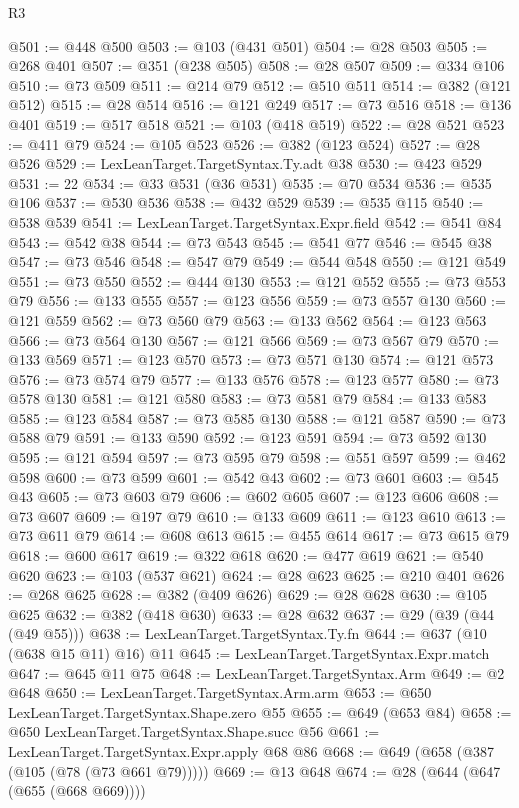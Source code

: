 \begin{lexlean}{R3}
\begin{coremodule}
@501 := @448 @500
@503 := @103 (@431 @501)
@504 := @28 @503
@505 := @268 @401
@507 := @351 (@238 @505)
@508 := @28 @507
@509 := @334 @106
@510 := @73 @509
@511 := @214 @79
@512 := @510 @511
@514 := @382 (@121 @512)
@515 := @28 @514
@516 := @121 @249
@517 := @73 @516
@518 := @136 @401
@519 := @517 @518
@521 := @103 (@418 @519)
@522 := @28 @521
@523 := @411 @79
@524 := @105 @523
@526 := @382 (@123 @524)
@527 := @28 @526
@529 := LexLeanTarget.TargetSyntax.Ty.adt @38
@530 := @423 @529
@531 := 22
@534 := @33 @531 (@36 @531)
@535 := @70 @534
@536 := @535 @106
@537 := @530 @536
@538 := @432 @529
@539 := @535 @115
@540 := @538 @539
@541 := LexLeanTarget.TargetSyntax.Expr.field
@542 := @541 @84
@543 := @542 @38
@544 := @73 @543
@545 := @541 @77
@546 := @545 @38
@547 := @73 @546
@548 := @547 @79
@549 := @544 @548
@550 := @121 @549
@551 := @73 @550
@552 := @444 @130
@553 := @121 @552
@555 := @73 @553 @79
@556 := @133 @555
@557 := @123 @556
@559 := @73 @557 @130
@560 := @121 @559
@562 := @73 @560 @79
@563 := @133 @562
@564 := @123 @563
@566 := @73 @564 @130
@567 := @121 @566
@569 := @73 @567 @79
@570 := @133 @569
@571 := @123 @570
@573 := @73 @571 @130
@574 := @121 @573
@576 := @73 @574 @79
@577 := @133 @576
@578 := @123 @577
@580 := @73 @578 @130
@581 := @121 @580
@583 := @73 @581 @79
@584 := @133 @583
@585 := @123 @584
@587 := @73 @585 @130
@588 := @121 @587
@590 := @73 @588 @79
@591 := @133 @590
@592 := @123 @591
@594 := @73 @592 @130
@595 := @121 @594
@597 := @73 @595 @79
@598 := @551 @597
@599 := @462 @598
@600 := @73 @599
@601 := @542 @43
@602 := @73 @601
@603 := @545 @43
@605 := @73 @603 @79
@606 := @602 @605
@607 := @123 @606
@608 := @73 @607
@609 := @197 @79
@610 := @133 @609
@611 := @123 @610
@613 := @73 @611 @79
@614 := @608 @613
@615 := @455 @614
@617 := @73 @615 @79
@618 := @600 @617
@619 := @322 @618
@620 := @477 @619
@621 := @540 @620
@623 := @103 (@537 @621)
@624 := @28 @623
@625 := @210 @401
@626 := @268 @625
@628 := @382 (@409 @626)
@629 := @28 @628
@630 := @105 @625
@632 := @382 (@418 @630)
@633 := @28 @632
@637 := @29 (@39 (@44 (@49 @55)))
@638 := LexLeanTarget.TargetSyntax.Ty.fn
@644 := @637 (@10 (@638 @15 @11) @16) @11
@645 := LexLeanTarget.TargetSyntax.Expr.match
@647 := @645 @11 @75
@648 := LexLeanTarget.TargetSyntax.Arm
@649 := @2 @648
@650 := LexLeanTarget.TargetSyntax.Arm.arm
@653 := @650 LexLeanTarget.TargetSyntax.Shape.zero @55
@655 := @649 (@653 @84)
@658 := @650 LexLeanTarget.TargetSyntax.Shape.succ @56
@661 := LexLeanTarget.TargetSyntax.Expr.apply @68 @86
@668 := @649 (@658 (@387 (@105 (@78 (@73 @661 @79)))))
@669 := @13 @648
@674 := @28 (@644 (@647 (@655 (@668 @669))))

\end{coremodule}
\end{lexlean}
